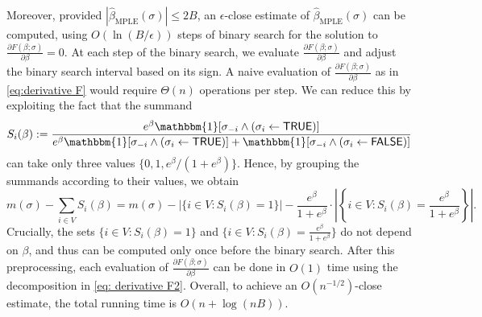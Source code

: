 \documentclass[11pt]{article}
\theoremstyle{definition}
\theoremstyle{remark}
\def\TRUE{\mathsf{TRUE}}
\def\FALSE{\mathsf{FALSE}}
\begin{document}
Moreover, provided $|\hat{\beta}_{\mathrm{MPLE}}(\sigma)|\le 2B$, an  $\epsilon$-close estimate of $\hat{\beta}_{\mathrm{MPLE}}(\sigma)$ can be computed, using $O(\ln{(B/\epsilon)})$ steps of binary search for the solution to $\frac{\partial F(\beta;\sigma)}{\partial \beta}=0$. At each step of the binary search, we evaluate $\frac{\partial F(\beta;\sigma)}{\partial \beta}$ and adjust the binary search interval based on its sign.
A naive evaluation of $\frac{\partial F(\beta;\sigma)}{\partial \beta}$ as in \eqref{eq:derivative F} would require $\Theta(n)$ operations  per step. We can reduce this by exploiting the fact that the summand
\[
S_i(\beta):=\frac{e^\beta  \mathbbm{1}[\sigma_{-i} \wedge (\sigma_i \leftarrow \TRUE)] }{ e^\beta \mathbbm{1}[\sigma_{-i} \wedge (\sigma_i \leftarrow \TRUE)] + \mathbbm{1}[\sigma_{-i} \wedge (\sigma_i \leftarrow \FALSE)]}
\] 
can take only three values $\{0,1, e^{\beta}/(1+e^{\beta})\}$. Hence, by grouping the summands according to their values, we obtain
\begin{equation}
    \label{eq: derivative F2}
 m(\sigma) - \sum_{i\in V} S_i( \beta)
 = m(\sigma) -  |\{i\in V: S_i(\beta) = 1\}|- \frac{e^\beta}{1+e^\beta} \cdot \left| \left\{i\in V: S_i(\beta) = \frac{e^\beta}{1+e^\beta} \right\} \right|.
\end{equation}
Crucially, the sets $\{i\in V: S_i(\beta) = 1\}$ and $\{i\in V: S_i(\beta) = \frac{e^\beta}{1+e^\beta} \}$ do not depend on $\beta$, and thus can be computed only once before the binary search.
After this preprocessing, each evaluation of $\frac{\partial F(\beta;\sigma)}{\partial \beta}$
  can be done in $O(1)$ time using the decomposition in \eqref{eq: derivative F2}. Overall, to achieve an $O(n^{-1/2})$-close estimate, the total running time is 
  $O(n+ \log (nB)).$
\end{document}
